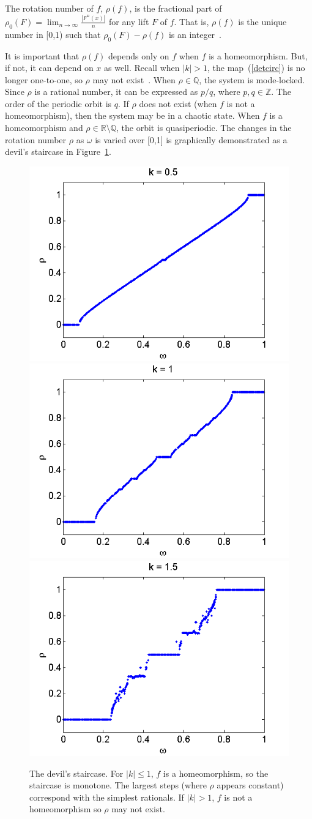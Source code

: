 \begin{singlespacing}
\begin{definition}\label{rho}
The rotation number of $f$, $\rho(f)$, is the fractional part of
$\rho_0(F) = \lim_{n \to \infty} \frac{|F^n(x)|}{n}$ for any lift $F$ of $f$. That is, $\rho(f)$ is the unique
number in [0,1) such that $\rho_0(F)-\rho(f)$ is an integer~\cite{devaney}.
\end{definition}
\end{singlespacing}

\noindent It is important that $\rho(f)$ depends only on $f$ when $f$
is a homeomorphism. But, if not, it can depend on $x$ as well. Recall when $|k|>1$,
the map~(\ref{detcirc}) is no longer one-to-one, so $\rho$
may not exist~\cite{devaney}. When $\rho \in \mathbb{Q}$, the system is mode-locked. Since
$\rho$ is a rational number, it can be expressed as $p/q$, where $p,q
\in \mathbb{Z}$. The order of the periodic orbit is $q$. If $\rho$
does not exist (when $f$ is not a homeomorphism), then the system may be in a chaotic
state. When $f$ is a homeomorphism and $\rho \in \mathbb{R} \setminus
\mathbb{Q}$, the orbit is quasiperiodic. The changes in the rotation number $\rho$ as $\omega$ is
varied over [0,1] is graphically demonstrated as a devil's staircase
in Figure~\ref{fig:devil_det}. 
\begin{figure}[!h]
\caption[The devil's staircase for the deterministic circle map]{The devil's
  staircase. For $|k| \leq 1$, $f$ is a homeomorphism, so the
  staircase is monotone. The largest steps (where $\rho$ appears
  constant) correspond with the simplest rationals. If $|k|>1$, $f$ is
  not a homeomorphism so $\rho$ may not exist.}\label{fig:devil_det}
	\begin{center}
		\includegraphics[width=.33\textwidth]{figs/detcirc_devil_k05.png}\hfill
		\includegraphics[width=.33\textwidth]{figs/detcirc_devil_k1.png}\hfill
		\includegraphics[width=.33\textwidth]{figs/detcirc_devil_k15.png}
	\end{center}
\end{figure}
